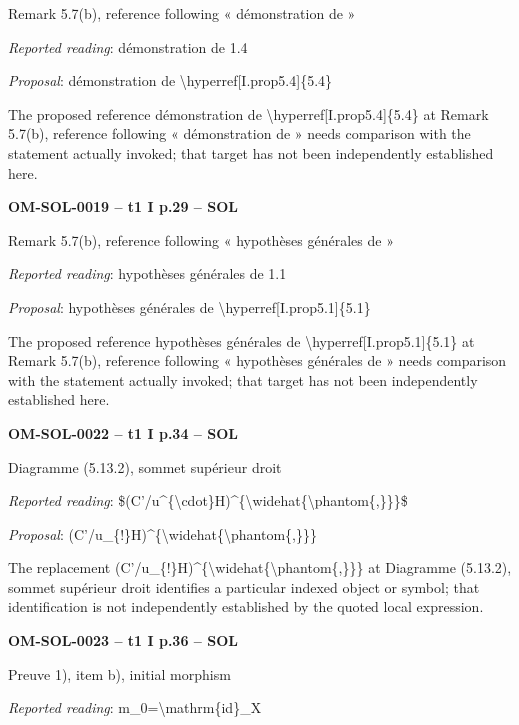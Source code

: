 Remark 5.7(b), reference following « démonstration de »\par
\emph{Reported reading}: démonstration de 1.4\par
\emph{Proposal}: démonstration de \textbackslash{}hyperref[I.prop5.4]\{5.4\}\par
The proposed reference démonstration de \textbackslash{}hyperref[I.prop5.4]\{5.4\} at Remark 5.7(b), reference following « démonstration de » needs comparison with the statement actually invoked; that target has not been independently established here.\par
\par\noindent\textbf{OM-SOL-0019 -- t1 I p.29 -- SOL}\par
Remark 5.7(b), reference following « hypothèses générales de »\par
\emph{Reported reading}: hypothèses générales de 1.1\par
\emph{Proposal}: hypothèses générales de \textbackslash{}hyperref[I.prop5.1]\{5.1\}\par
The proposed reference hypothèses générales de \textbackslash{}hyperref[I.prop5.1]\{5.1\} at Remark 5.7(b), reference following « hypothèses générales de » needs comparison with the statement actually invoked; that target has not been independently established here.\par
\par\noindent\textbf{OM-SOL-0022 -- t1 I p.34 -- SOL}\par
Diagramme (5.13.2), sommet supérieur droit\par
\emph{Reported reading}: \$(C'/u\textasciicircum{}\{\textbackslash{}cdot\}H)\textasciicircum{}\{\textbackslash{}widehat\{\textbackslash{}phantom\{,\}\}\}\$\par
\emph{Proposal}: (C'/u\_\{!\}H)\textasciicircum{}\{\textbackslash{}widehat\{\textbackslash{}phantom\{,\}\}\}\par
The replacement (C'/u\_\{!\}H)\textasciicircum{}\{\textbackslash{}widehat\{\textbackslash{}phantom\{,\}\}\} at Diagramme (5.13.2), sommet supérieur droit identifies a particular indexed object or symbol; that identification is not independently established by the quoted local expression.\par
\par\noindent\textbf{OM-SOL-0023 -- t1 I p.36 -- SOL}\par
Preuve 1), item b), initial morphism\par
\emph{Reported reading}: m\_0=\allowbreak \textbackslash{}mathrm\{id\}\_X\par
